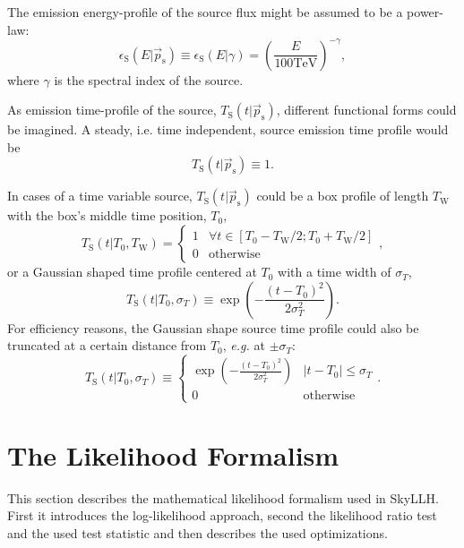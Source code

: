 \documentclass{article}
\newcommand{\ps}{\vec{p}_{\mathrm{s}}}
\begin{document}
The emission energy-profile of the source flux might be assumed to be a power-law:
\begin{equation}
 \epsilon_{\mathrm{S}}(E|\ps) \equiv \epsilon_{\mathrm{S}}(E|\gamma) = \left(\frac{E}{100\mathrm{TeV}}\right)^{-\gamma},
\end{equation}
where $\gamma$ is the spectral index of the source.

As emission time-profile of the source, $T_{\mathrm{S}}(t|\ps)$, different functional
forms could be imagined.
A steady, i.e. time independent, source emission time profile would be
\begin{equation}
 T_{\mathrm{S}}(t|\ps) \equiv 1.
\end{equation}

In cases of a time variable source, $T_{\mathrm{S}}(t|\ps)$ could be a box
profile of length $T_{\mathrm{W}}$ with the box's middle time position, $T_{0}$,
\begin{equation}
 T_{\mathrm{S}}(t|T_0,T_{\mathrm{W}}) =
   \begin{cases}
     1 & \forall t \in \left[T_0 - T_{\mathrm{W}}/2; T_0 + T_{\mathrm{W}}/2 \right]\\
     0 & \mathrm{otherwise}
   \end{cases},
 \label{eq:Ts-box}
\end{equation}
or a Gaussian shaped time profile centered at $T_0$ with a time width of $\sigma_T$,
\begin{equation}
 T_{\mathrm{S}}(t|T_0,\sigma_T) \equiv \exp\left(-\frac{(t - T_0)^2}{2\sigma_T^2}\right).
 \label{eq:Ts-gauss-non-truncated}
\end{equation}
For efficiency reasons, the Gaussian shape source time profile could also be
truncated at a certain distance from $T_0$, \emph{e.g.} at $\pm\sigma_T$:
\begin{equation}
 T_{\mathrm{S}}(t|T_0,\sigma_T) \equiv
   \begin{cases}
     \exp\left(-\frac{(t - T_0)^2}{2\sigma_T^2}\right) & \left|t-T_0\right| \le \sigma_T\\
     0 & \mathrm{otherwise}
   \end{cases}.
 \label{eq:Ts-gauss-truncated}
\end{equation}


\section{The Likelihood Formalism}

This section describes the mathematical likelihood formalism used in SkyLLH.
First it introduces the log-likelihood approach, second the likelihood ratio
test and the used test statistic and then describes the used optimizations.
\end{document}
